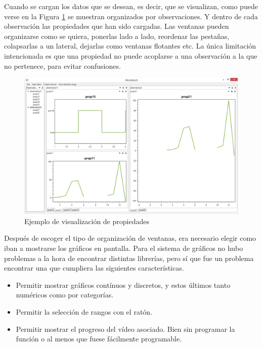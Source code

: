 Cuando se cargan los datos que se desean, es decir, que se visualizan, como puede verse en la
Figura \ref{fig:EjemploObservacion} se muestran organizados por observaciones. Y dentro de cada
observaci\'on las propiedades que han sido cargadas. Las ventanas pueden organizarse como se quiera, ponerlas lado a lado,
reordenar las pesta\~nas, colapsarlas a un lateral, dejarlas como ventanas flotantes etc. 
La \'unica limitaci\'on intencionada es que una propiedad no puede acoplarse a una observaci\'on a la que no pertenece,
para evitar confusiones.

\begin{figure}[h]
	\centering
	\includegraphics[width=0.9\linewidth]{./Figures/Capturas/EjemploObservacion.PNG}
	\caption{Ejemplo de visualizaci\'on de propiedades}
	\label{fig:EjemploObservacion}
\end{figure}

Despu\'es de escoger el tipo de organizaci\'on de ventanas, era necesario elegir como iban a mostrarse los gr\'aficos en pantalla.
Para el sistema de gr\'aficos no hubo problemas a la hora de encontrar distintas librer\'ias, pero s\'i que fue un 
problema encontrar una que cumpliera las siguientes caracter\'isticas.

\begin{itemize}
	\item Permitir mostrar gr\'{a}ficos cont\'{i}nuos y discretos, y estos \'{u}ltimos tanto num\'{e}ricos como por categor\'{i}as.
	\item Permitir la selecci\'{o}n de rangos con el rat\'{o}n.
	\item Permitir mostrar el progreso del v\'{i}deo asociado. Bien sin programar la funci\'{o}n o al menos que fuese f\'{a}cilmente programable.
\end{itemize}

